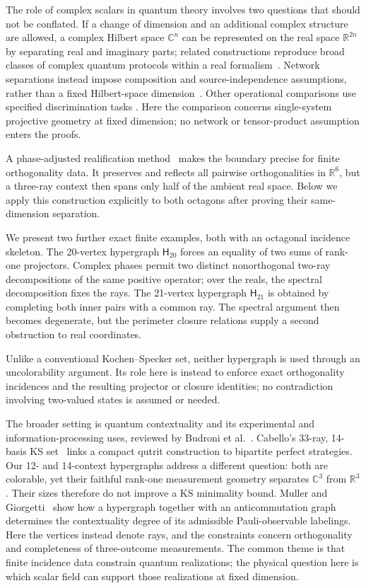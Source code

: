 \documentclass[12pt,a4paper]{article}
\theoremstyle{definition}
\theoremstyle{remark}
\newcommand{\C}{\mathbb C}
\newcommand{\R}{\mathbb R}
\newcommand{\Htwenty}{\mathsf H_{20}}
\newcommand{\Htwentyone}{\mathsf H_{21}}
\begin{document}
The role of complex scalars in quantum theory involves two questions that
should not be conflated.  If a change of dimension and an additional complex
structure are allowed, a complex Hilbert space $\C^n$ can be represented on
the real space $\R^{2n}$ by separating real and imaginary parts; related
constructions reproduce broad classes of complex quantum protocols within a
real formalism~\cite{Hardy2012LimitedHolism,Aleksandrova2013UniversalQubit,
McKague2009SimulatingRealHilbert}.  Network separations instead impose
composition and source-independence assumptions, rather than a fixed
Hilbert-space dimension~\cite{renou-2021,Weilenmann2025PartialIndependencePRL}.
Other operational comparisons use specified discrimination tasks
\cite{Bednorz2022OptimalDiscrimination}.  Here the comparison concerns
single-system projective geometry at fixed dimension; no network or
tensor-product assumption enters the proofs.

A phase-adjusted realification method~\cite{svozil-2025-rvc} makes the boundary precise for finite
orthogonality data.  It preserves and reflects all pairwise orthogonalities in
$\R^6$, but a three-ray context then spans only half of the ambient real
space.  Below we apply this construction explicitly to both octagons after
proving their same-dimension separation.

We present two further exact finite examples, both with an octagonal incidence
skeleton.  The 20-vertex hypergraph $\Htwenty$ forces an equality of
two sums of rank-one projectors.  Complex phases permit two distinct
nonorthogonal two-ray decompositions of the same positive operator; over the
reals, the spectral decomposition fixes the rays.  The 21-vertex hypergraph
$\Htwentyone$ is obtained by completing both inner pairs with a common ray.
The spectral argument then becomes degenerate, but the perimeter closure
relations supply a second obstruction to real coordinates.

Unlike a conventional Kochen--Specker set, neither hypergraph is used through
an uncolorability argument.  Its role here is instead to enforce exact
orthogonality incidences and the resulting projector or closure identities;
no contradiction involving two-valued states is assumed or needed.

The broader setting is quantum contextuality and its experimental and
information-processing uses, reviewed by Budroni et al.~\cite{Budroni2022KS}.
Cabello's 33-ray, 14-basis KS set~\cite{Cabello2025SimplestKS} links a compact
qutrit construction to bipartite perfect strategies.  Our 12- and 14-context
hypergraphs address a different question: both are colorable, yet their
faithful rank-one measurement geometry separates $\C^3$ from $\R^3$.
Their sizes therefore do not improve a KS minimality bound.
Muller and Giorgetti~\cite{MullerGiorgetti2025Hypergram} show how a
hypergraph together with an anticommutation graph determines the
contextuality degree of its admissible Pauli-observable labelings.
Here the vertices instead denote rays, and the constraints concern
orthogonality and completeness of three-outcome measurements.  The
common theme is that finite incidence data constrain quantum
realizations; the physical question here is which scalar field can
support those realizations at fixed dimension.
\end{document}
